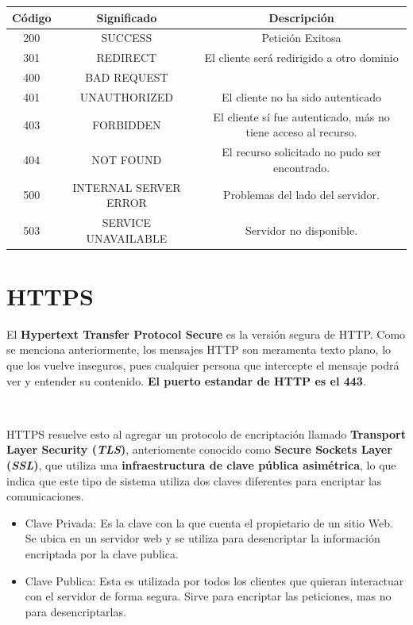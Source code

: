 \documentclass[a4paper,10pt]{article}
\begin{document}
\begin{tabular}{| c | c | c |}
    \hline
    Código & Significado & Descripción \\
    \hline
    200 & SUCCESS &  Petición Exitosa\\
    \hline
    301 & REDIRECT & El cliente será redirigido a otro dominio \\
    \hline
    400 & BAD REQUEST & \\
    \hline
    401 & UNAUTHORIZED & El cliente no ha sido autenticado \\
    \hline
    403 & FORBIDDEN & El cliente sí fue autenticado, más no tiene acceso al recurso. \\
    \hline
    404 & NOT FOUND & El recurso solicitado no pudo ser encontrado. \\
    \hline
    500 & INTERNAL SERVER ERROR & Problemas del lado del servidor. \\
    \hline
    503 & SERVICE UNAVAILABLE & Servidor no disponible. \\
    \hline
\end{tabular}



\section{HTTP\textbf{S}}

El \textbf{Hypertext Transfer Protocol Secure} es la versión segura de HTTP. Como se menciona anteriormente, los mensajes HTTP son meramenta texto plano, lo que los vuelve inseguros, pues
cualquier persona que intercepte el mensaje podrá ver y entender su contenido. \textbf{El puerto estandar de HTTP es el 443}.

\

HTTPS resuelve esto al agregar un protocolo de encriptación llamado \textbf{Transport Layer Security (\textit{TLS})}, anteriomente conocido como \textbf{Secure Sockets Layer (\textit{SSL})}, que utiliza una \textbf{infraestructura de clave pública asimétrica},
lo que indica que este tipo de sistema utiliza dos claves diferentes para encriptar las comunicaciones.

\begin{itemize}
    \item Clave Privada: Es la clave con la que cuenta el propietario de un sitio Web. Se ubica en un servidor web y se utiliza para desencriptar la información encriptada por la clave publica.
    \item Clave Publica: Esta es utilizada por todos los clientes que quieran interactuar con el servidor de forma segura. Sirve para encriptar las peticiones, mas no para desencriptarlas. 
\end{itemize}
\end{document}
